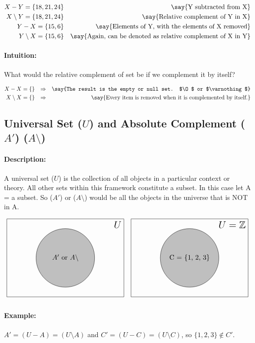 \documentclass[12pt]{article}
\newcommand*{\largeMath}[1]{\mbox{\Large$#1$}}
\begin{document}
\begin{align}
  X - Y = \{18, 21, 24\} &&
  \text{\say{Y subtracted from X}} \\
  X \setminus Y = \{18, 21, 24\} &&
  \text{\say{Relative complement of Y in X}} \\
  Y - X = \{15, 6\} &&
  \text{\say{Elements of Y, with the elements of X removed}} \\
  Y \setminus X = \{15, 6\} &&
  \text{\say{Again, can be denoted as relative complement of X in Y}}
\end{align}%

\paragraph{Intuition:} What would the relative complement of set be if we complement it by itself?

\begin{align}
  X - X = \{\} && \Rightarrow &&
  \text{\say{The result is the empty or null set. $\O$ or $\varnothing$}} \\
  X \setminus X = \{\} && \Rightarrow &&
  \text{\say{Every item is removed when it is complemented by itself.}}
\end{align}%

\subsection{Universal Set ($U$) and Absolute Complement ($A'$) ($A\setminus$)}

\paragraph{Description:}
A universal set ($U$) is the collection of all objects in a particular context or theory. All other sets within this framework constitute a subset. In this case let A = a subset. So ($A'$) or ($A\setminus$) would be all the objects in the universe that is NOT in A.

\begin{align}
\begin{tikzpicture}
  \draw (-3,-2) rectangle (3,2) node[below left]{\largeMath{U}};
  \fill[lightgray] (0,0) circle (1.5cm) node {$A'$ or $A\setminus$};
  \draw (0,0) circle (1.5cm) node {$A'$ or $A\setminus$};
\end{tikzpicture} && %
\begin{tikzpicture}
  \draw (-3,-2) rectangle (3,2) node[below left]{\largeMath{U=\mathbb{Z}}};
  \fill[lightgray] (0,0) circle (1.5cm) node {C = {1, 2, 3}};
  \draw (0,0) circle (1.5cm)  node {C = \{1, 2, 3\}};
\end{tikzpicture}
\end{align}
\paragraph{Example:}  $A' = (U - A) = (U\setminus A)$ and $C' = (U - C) = (U\setminus C)$, so $\{1, 2, 3\} \notin C'$.
\end{document}
